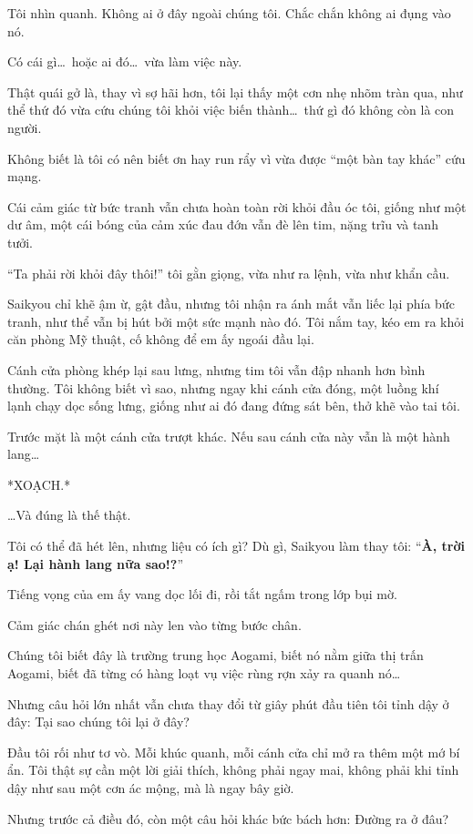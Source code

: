 \documentclass[../main.tex]{subfiles}
\begin{document}
Tôi nhìn quanh. Không ai ở đây ngoài chúng tôi. Chắc chắn không ai đụng vào nó.

Có cái gì\dots\ hoặc ai đó\dots\ vừa làm việc này.

Thật quái gở là, thay vì sợ hãi hơn, tôi lại thấy một cơn nhẹ nhõm tràn qua, như thể thứ đó vừa cứu chúng tôi khỏi việc biến thành\dots\ thứ gì đó không còn là con người.

Không biết là tôi có nên biết ơn hay run rẩy vì vừa được ``một bàn tay khác'' cứu mạng.

Cái cảm giác từ bức tranh vẫn chưa hoàn toàn rời khỏi đầu óc tôi, giống như một dư âm, một cái bóng của cảm xúc đau đớn vẫn đè lên tim, nặng trĩu và tanh tưởi.

``Ta phải rời khỏi đây thôi!'' tôi gằn giọng, vừa như ra lệnh, vừa như khẩn cầu.

Saikyou chỉ khẽ ậm ừ, gật đầu, nhưng tôi nhận ra ánh mắt vẫn liếc lại phía bức tranh, như thể vẫn bị hút bởi một sức mạnh nào đó. Tôi nắm tay, kéo em ra khỏi căn phòng Mỹ thuật, cố không để em ấy ngoái đầu lại.

Cánh cửa phòng khép lại sau lưng, nhưng tim tôi vẫn đập nhanh hơn bình thường. Tôi không biết vì sao, nhưng ngay khi cánh cửa đóng, một luồng khí lạnh chạy dọc sống lưng, giống như ai đó đang đứng sát bên, thở khẽ vào tai tôi.

Trước mặt là một cánh cửa trượt khác. Nếu sau cánh cửa này vẫn là một hành lang\dots

*XOẠCH.*

\dots Và đúng là thế thật.

Tôi có thể đã hét lên, nhưng liệu có ích gì? Dù gì, Saikyou làm thay tôi: ``\textbf{À, trời ạ! Lại hành lang nữa sao!?}''

Tiếng vọng của em ấy vang dọc lối đi, rồi tắt ngấm trong lớp bụi mờ.

Cảm giác chán ghét nơi này len vào từng bước chân.

Chúng tôi biết đây là trường trung học Aogami, biết nó nằm giữa thị trấn Aogami, biết đã từng có hàng loạt vụ việc rùng rợn xảy ra quanh nó\dots\

Nhưng câu hỏi lớn nhất vẫn chưa thay đổi từ giây phút đầu tiên tôi tỉnh dậy ở đây: Tại sao chúng tôi lại ở đây?

Đầu tôi rối như tơ vò. Mỗi khúc quanh, mỗi cánh cửa chỉ mở ra thêm một mớ bí ẩn. Tôi thật sự cần một lời giải thích, không phải ngay mai, không phải khi tỉnh dậy như sau một cơn ác mộng, mà là ngay bây giờ.

Nhưng trước cả điều đó, còn một câu hỏi khác bức bách hơn: Đường ra ở đâu?
\end{document}
